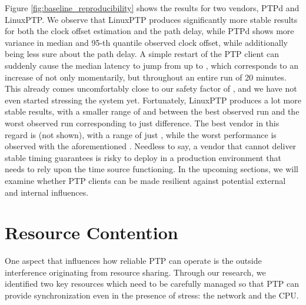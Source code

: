 {

Figure \ref{fig:baseline_reproducibility} shows the results for two vendors, PTPd and LinuxPTP. We observe that LinuxPTP produces significantly more stable results for both the clock offset estimation and the path delay, while PTPd shows more variance in median and 95-th quantile observed clock offset, while additionally being less sure about the path delay. A simple restart of the PTP client can suddenly cause the median latency to jump from  up to , which corresponds to an increase of  not only momentarily, but throughout an entire run of 20 minutes. This already comes uncomfortably close to our safety factor of \safetyMargin, and we have not even started stressing the system yet. Fortunately, LinuxPTP produces a lot more stable results, with a smaller range of  and  between the best observed run and the worst observed run corresponding to just  difference. The best vendor in this regard is \fVendor{\cmpMinArg} (not shown), with a range of just \fRelative{\cmpMin}, while the worst performance is observed with the aforementioned \fVendor{\cmpMaxArg}.
%
%
Needless to say, a vendor that cannot deliver stable timing guarantees is risky to deploy in a production environment that needs to rely upon the time source functioning. In the upcoming sections, we will examine whether PTP clients can be made resilient against potential external and internal influences.

}

\section{Resource Contention}

One aspect that influences how reliable PTP can operate is the outside interference originating from resource sharing. Through our research, we identified two key resources which need to be carefully managed so that PTP can provide synchronization even in the presence of stress: the network and the CPU.


